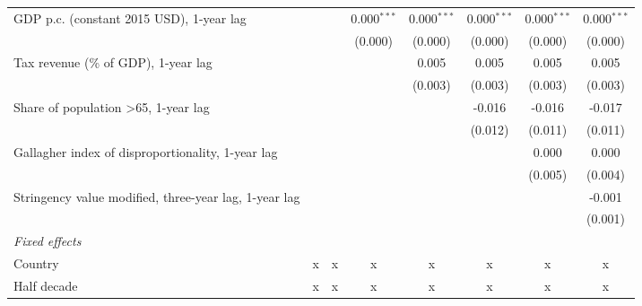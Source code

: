 \begin{table}[htbp]
\begin{tabular}{lccccccc}
      GDP p.c. (constant 2015 USD), 1-year lag                         &              &               & 0.000$^{***}$ & 0.000$^{***}$ & 0.000$^{***}$ & 0.000$^{***}$ & 0.000$^{***}$\\   
                                                                       &              &               & (0.000)       & (0.000)       & (0.000)       & (0.000)       & (0.000)\\   
      Tax revenue (\% of GDP), 1-year lag                              &              &               &               & 0.005         & 0.005         & 0.005         & 0.005\\   
                                                                       &              &               &               & (0.003)       & (0.003)       & (0.003)       & (0.003)\\   
      Share of population >65, 1-year lag                              &              &               &               &               & -0.016        & -0.016        & -0.017\\   
                                                                       &              &               &               &               & (0.012)       & (0.011)       & (0.011)\\   
      Gallagher index of disproportionality, 1-year lag                &              &               &               &               &               & 0.000         & 0.000\\   
                                                                       &              &               &               &               &               & (0.005)       & (0.004)\\   
      Stringency value modified, three-year lag, 1-year lag            &              &               &               &               &               &               & -0.001\\   
                                                                       &              &               &               &               &               &               & (0.001)\\   
      \emph{Fixed effects}\\
      Country                                                          & x            & x             & x             & x             & x             & x             & x\\  
      Half decade                                                      & x            & x             & x             & x             & x             & x             & x\\  

\end{tabular}
\end{table}
